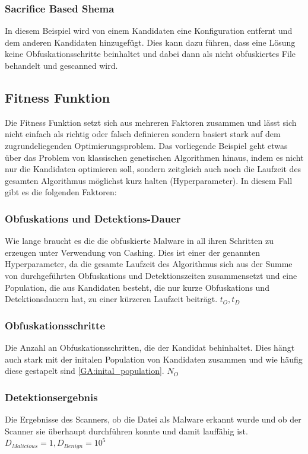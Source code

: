 \subsubsection{Sacrifice Based Shema}
In diesem Beispiel wird von einem Kandidaten eine Konfiguration entfernt und dem anderen Kandidaten hinzugefügt. Dies kann dazu führen, dass eine Lösung keine Obfuskationsschritte beinhaltet und dabei dann als nicht obfuskiertes File behandelt und gescanned wird.



\subsection{Fitness Funktion}
Die Fitness Funktion setzt sich aus mehreren Faktoren zusammen und lässt sich nicht einfach als richtig oder falsch definieren sondern basiert stark auf dem zugrundeliegenden Optimierungsproblem. Das vorliegende Beispiel geht etwas über das Problem von klassischen genetischen Algorithmen hinaus, indem es nicht nur die Kandidaten optimieren soll, sondern zeitgleich auch noch die Laufzeit des gesamten Algorithmus möglichst kurz halten (Hyperparameter).
In diesem Fall gibt es die folgenden Faktoren:

\subsubsection{Obfuskations und Detektions-Dauer}
Wie lange braucht es die die obfuskierte Malware in all ihren Schritten zu erzeugen unter Verwendung von Cashing. Dies ist einer der genannten Hyperparameter, da die gesamte Laufzeit des Algorithmus sich aus der Summe von durchgeführten Obfuskations und Detektionszeiten zusammensetzt und eine Population, die aus Kandidaten besteht, die nur kurze Obfuskations und Detektionsdauern hat, zu einer kürzeren Laufzeit beiträgt. $t_O,  t_D$
\subsubsection{Obfuskationsschritte}
Die Anzahl an Obfuskationsschritten, die der Kandidat behinhaltet. Dies hängt auch stark mit der initalen Population von Kandidaten zusammen und wie häufig diese gestapelt sind \ref{GA:inital_population}. $N_O$
\subsubsection{Detektionsergebnis}
Die Ergebnisse des Scanners, ob die Datei als Malware erkannt wurde und ob der Scanner sie überhaupt durchführen konnte und damit lauffähig ist. $D_{Malicious}=1, D_{Benign}=10^5$

